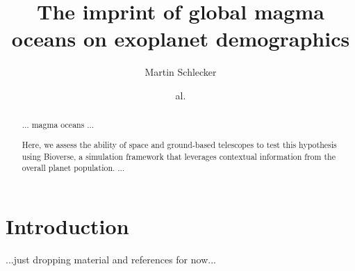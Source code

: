 \documentclass[modern]{aastex631}
\begin{document}
\title{The imprint of global magma oceans on exoplanet demographics}

\author[0000-0001-8355-2107]{Martin Schlecker}
\author{al.}


\begin{abstract}
    $\ldots$ magma oceans $\ldots$

    Here, we assess the ability of space and ground-based telescopes to test this hypothesis using Bioverse, a simulation framework that leverages contextual information from the overall planet population.
    $\ldots$

\end{abstract}

\section{Introduction}
...just dropping material and references for now...
\end{document}
